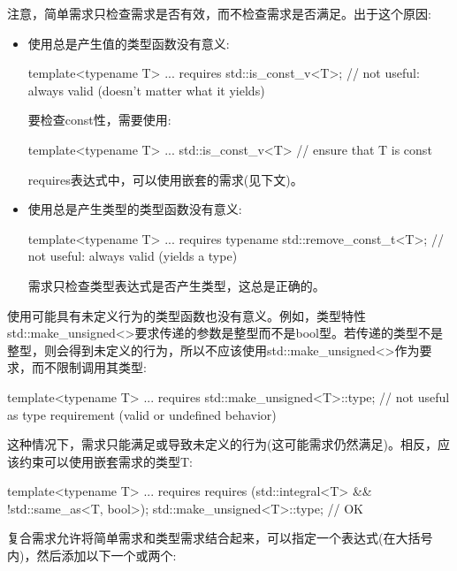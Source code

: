 注意，简单需求只检查需求是否有效，而不检查需求是否满足。出于这个原因:

\begin{itemize}
\item
使用总是产生值的类型函数没有意义:

\begin{cpp}
template<typename T>
... requires {
	std::is_const_v<T>; // not useful: always valid (doesn’t matter what it yields)
}
\end{cpp}

要检查const性，需要使用:

\begin{cpp}
template<typename T>
... std::is_const_v<T> // ensure that T is const
\end{cpp}

requires表达式中，可以使用嵌套的需求(见下文)。

\item
使用总是产生类型的类型函数没有意义:

\begin{cpp}
template<typename T>
... requires {
	typename std::remove_const_t<T>; // not useful: always valid (yields a type)
}
\end{cpp}

需求只检查类型表达式是否产生类型，这总是正确的。
\end{itemize}

使用可能具有未定义行为的类型函数也没有意义。例如，类型特性std::make\_unsigned<>要求传递的参数是整型而不是bool型。若传递的类型不是整型，则会得到未定义的行为，所以不应该使用std::make\_unsigned<>作为要求，而不限制调用其类型:

\begin{cpp}
template<typename T>
... requires {
	std::make_unsigned<T>::type; // not useful as type requirement (valid or undefined behavior)
}
\end{cpp}

这种情况下，需求只能满足或导致未定义的行为(这可能需求仍然满足)。相反，应该约束可以使用嵌套需求的类型T:

\begin{cpp}
template<typename T>
... requires {
	requires (std::integral<T> && !std::same_as<T, bool>);
	std::make_unsigned<T>::type; // OK
}
\end{cpp}


复合需求允许将简单需求和类型需求结合起来，可以指定一个表达式(在大括号内)，然后添加以下一个或两个:

